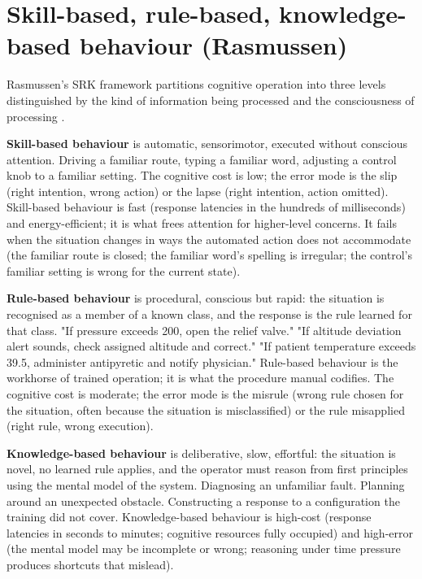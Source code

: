 \section{Skill-based, rule-based, knowledge-based behaviour (Rasmussen)}

Rasmussen's SRK framework partitions cognitive operation into three levels distinguished by the kind of information being processed and the consciousness of processing \cite{paper:rasmussen-skills-rules-knowledge-1983}.

\textbf{Skill-based behaviour} is automatic, sensorimotor, executed without conscious attention. Driving a familiar route, typing a familiar word, adjusting a control knob to a familiar setting. The cognitive cost is low; the error mode is the slip (right intention, wrong action) or the lapse (right intention, action omitted). Skill-based behaviour is fast (response latencies in the hundreds of milliseconds) and energy-efficient; it is what frees attention for higher-level concerns. It fails when the situation changes in ways the automated action does not accommodate (the familiar route is closed; the familiar word's spelling is irregular; the control's familiar setting is wrong for the current state).

\textbf{Rule-based behaviour} is procedural, conscious but rapid: the situation is recognised as a member of a known class, and the response is the rule learned for that class. "If pressure exceeds 200, open the relief valve." "If altitude deviation alert sounds, check assigned altitude and correct." "If patient temperature exceeds 39.5, administer antipyretic and notify physician." Rule-based behaviour is the workhorse of trained operation; it is what the procedure manual codifies. The cognitive cost is moderate; the error mode is the misrule (wrong rule chosen for the situation, often because the situation is misclassified) or the rule misapplied (right rule, wrong execution).

\textbf{Knowledge-based behaviour} is deliberative, slow, effortful: the situation is novel, no learned rule applies, and the operator must reason from first principles using the mental model of the system. Diagnosing an unfamiliar fault. Planning around an unexpected obstacle. Constructing a response to a configuration the training did not cover. Knowledge-based behaviour is high-cost (response latencies in seconds to minutes; cognitive resources fully occupied) and high-error (the mental model may be incomplete or wrong; reasoning under time pressure produces shortcuts that mislead).

